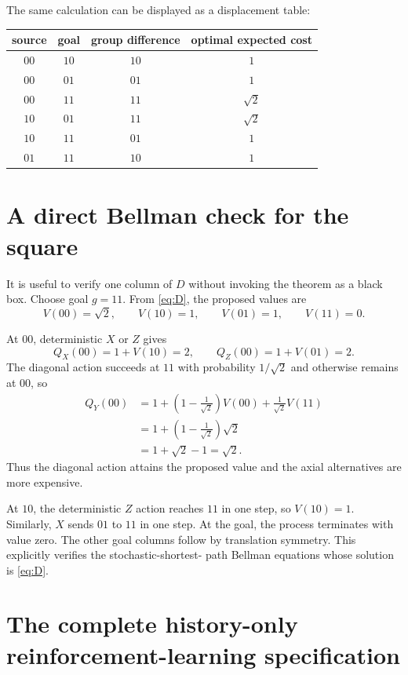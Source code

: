 \documentclass[11pt]{article}
\theoremstyle{definition}
\theoremstyle{remark}
\begin{document}
The same calculation can be displayed as a displacement table:
\begin{center}
\begin{tabular}{c c c c}
\toprule
source & goal & group difference & optimal expected cost\\
\midrule
\(00\)&\(10\)&\(10\)&\(1\)\\
\(00\)&\(01\)&\(01\)&\(1\)\\
\(00\)&\(11\)&\(11\)&\(\sqrt2\)\\
\(10\)&\(01\)&\(11\)&\(\sqrt2\)\\
\(10\)&\(11\)&\(01\)&\(1\)\\
\(01\)&\(11\)&\(10\)&\(1\)\\
\bottomrule
\end{tabular}
\end{center}

\section{A direct Bellman check for the square}

It is useful to verify one column of \(D\) without invoking the theorem as a
black box. Choose goal \(g=11\). From \eqref{eq:D}, the proposed values are
\[
 V(00)=\sqrt2,\qquad V(10)=1,\qquad V(01)=1,\qquad V(11)=0.
\]

At \(00\), deterministic \(X\) or \(Z\) gives
\[
 Q_X(00)=1+V(10)=2,
 \qquad
 Q_Z(00)=1+V(01)=2.
\]
The diagonal action succeeds at \(11\) with probability \(1/\sqrt2\) and
otherwise remains at \(00\), so
\begin{align*}
 Q_Y(00)
 &=1+\left(1-\frac1{\sqrt2}\right)V(00)
   +\frac1{\sqrt2}V(11)\\
 &=1+\left(1-\frac1{\sqrt2}\right)\sqrt2\\
 &=1+\sqrt2-1=\sqrt2.
\end{align*}
Thus the diagonal action attains the proposed value and the axial alternatives
are more expensive.

At \(10\), the deterministic \(Z\) action reaches \(11\) in one step, so
\(V(10)=1\). Similarly, \(X\) sends \(01\) to \(11\) in one step. At the
goal, the process terminates with value zero.  The other goal columns follow
by translation symmetry.  This explicitly verifies the stochastic-shortest-
path Bellman equations whose solution is \eqref{eq:D}.

\section{The complete history-only reinforcement-learning specification}
\label{sec:complete-mdp}
\end{document}
